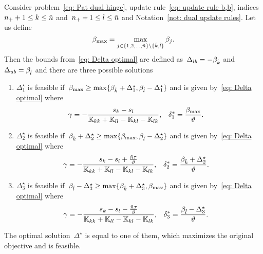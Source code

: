 \begin{lemma}\label{thm: patmat family hinge update b,b}
  Consider problem~\eqref{eq: Pat dual hinge}, update rule~\eqref{eq: update rule b,b}, indices~$n_{+} + 1 \leq k \leq \tilde{n}$ and~$n_{+} + 1 \leq l \leq \tilde{n}$ and Notation~\ref{not: dual update rules}. Let us define
  \begin{equation*}
    \beta_{\max} = \max_{j \in \{1, 2, \ldots, \tilde{n} \} \setminus \{\hat{k}, \hat{l}\}} \beta_j.
  \end{equation*}
  Then the bounds from~\eqref{eq: Delta optimal} are defined as~$\Delta_{lb} = - \beta_{\hat{k}}$ and~$\Delta_{ub} = \beta_{\hat{l}}$ and there are three possible solutions
  \begin{enumerate}
    \item $\Delta^{\star}_1$ is feasible if~$\beta_{\max} \geq \max\{\beta_{\hat{k}} + \Delta^{\star}_1, \beta_{\hat{l}} - \Delta^{\star}_1\}$ and is given by~\eqref{eq: Delta optimal} where
    \begin{align*}
      \gamma
        & = -\frac{s_k - s_l}{\mathbb{K}_{kk} + \mathbb{K}_{ll} - \mathbb{K}_{kl} - \mathbb{K}_{lk}}, &
      \delta^{*}_1
        & = \frac{\beta_{\max}}{\vartheta}.
    \end{align*}
    \item $\Delta^{\star}_2$ is feasible if~$\beta_{\hat{k}} + \Delta^{\star}_2 \geq \max\{\beta_{\max} , \beta_{\hat{l}} - \Delta^{\star}_2\}$ and is given by~\eqref{eq: Delta optimal} where
    \begin{align*}
      \gamma
        & = -\frac{s_k - s_l + \frac{\tilde{n} \tau}{\vartheta}}{\mathbb{K}_{kk} + \mathbb{K}_{ll} - \mathbb{K}_{kl} - \mathbb{K}_{lk}}, &
      \delta^{*}_2
        & = \frac{\beta_{\hat{k}} + \Delta^{\star}_2}{\vartheta}.
    \end{align*}
    \item $\Delta^{\star}_3$ is feasible if~$\beta_{\hat{l}} - \Delta^{\star}_3 \geq \max\{\beta_{\hat{k}} + \Delta^{\star}_3, \beta_{\max}\}$ and is given by~\eqref{eq: Delta optimal} where
    \begin{align*}
      \gamma
        & = -\frac{s_k - s_l - \frac{\tilde{n} \tau}{\vartheta}}{\mathbb{K}_{kk} + \mathbb{K}_{ll} - \mathbb{K}_{kl} - \mathbb{K}_{lk}}, &
      \delta^{*}_3
        & = \frac{\beta_{\hat{l}} - \Delta^{\star}_3}{\vartheta}.
    \end{align*}
  \end{enumerate}
  The optimal solution~$\Delta^{\star}$ is equal to one of them, which maximizes the original objective and is feasible.
\end{lemma}

